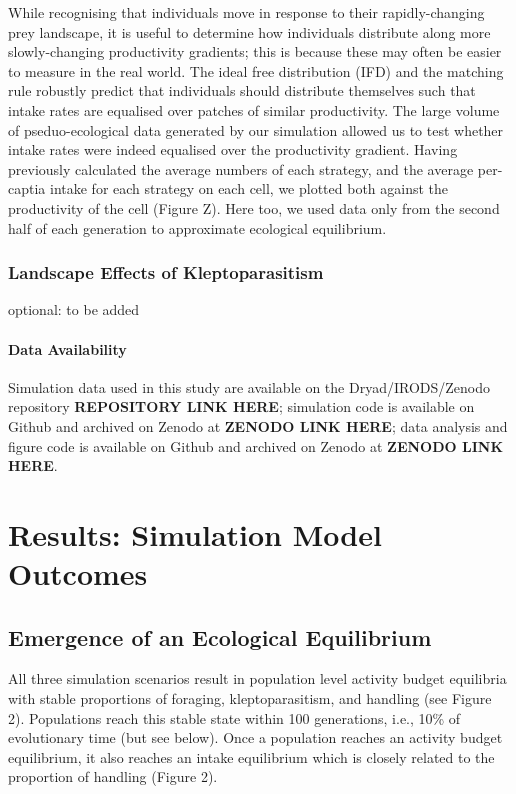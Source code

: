 \documentclass[11pt]{article}
\begin{document}
While recognising that individuals move in response to their rapidly-changing prey landscape, it is useful to determine how individuals distribute along more slowly-changing productivity gradients; 
this is because these may often be easier to measure in the real world.
The ideal free distribution (IFD) and the matching rule robustly predict that individuals should distribute themselves such that intake rates are equalised over patches of similar productivity.
The large volume of pseduo-ecological data generated by our simulation allowed us to test whether intake rates were indeed equalised over the productivity gradient.
Having previously calculated the average numbers of each strategy, and the average per-captia intake for each strategy on each cell, we plotted both against the productivity of the cell (Figure Z).
Here too, we used data only from the second half of each generation to approximate ecological equilibrium.

\subsubsection{Landscape Effects of Kleptoparasitism}

optional: to be added

\paragraph*{Data Availability}

Simulation data used in this study are available on the Dryad/IRODS/Zenodo repository \textbf{REPOSITORY LINK HERE}; 
simulation code is available on Github and archived on Zenodo at \textbf{ZENODO LINK HERE}; 
data analysis and figure code is available on Github and archived on Zenodo at \textbf{ZENODO LINK HERE}.

\section{Results: Simulation Model Outcomes}

\subsection{Emergence of an Ecological Equilibrium}

All three simulation scenarios result in population level activity budget equilibria with stable proportions of foraging, kleptoparasitism, and handling (see Figure 2).
Populations reach this stable state within 100 generations, i.e., 10\% of evolutionary time (but see below).
Once a population reaches an activity budget equilibrium, it also reaches an intake equilibrium which is closely related to the proportion of handling (Figure 2).
\end{document}
